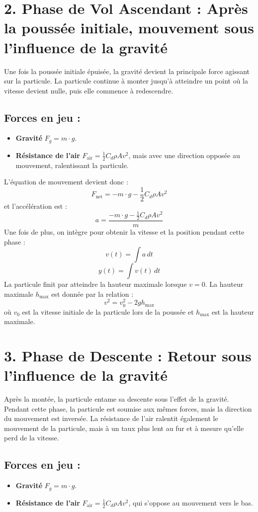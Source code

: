 \documentclass[12pt]{article}
\begin{document}
\section*{2. Phase de Vol Ascendant : Après la poussée initiale, mouvement sous l'influence de la gravité}

Une fois la poussée initiale épuisée, la gravité devient la principale force agissant sur la particule. La particule continue à monter jusqu'à atteindre un point où la vitesse devient nulle, puis elle commence à redescendre.

\subsection*{Forces en jeu :}
\begin{itemize}
  \item \textbf{Gravité} \( F_g = m \cdot g \).
  \item \textbf{Résistance de l'air} \( F_{\text{air}} = \frac{1}{2} C_d \rho A v^2 \), mais avec une direction opposée au mouvement, ralentissant la particule.
\end{itemize}

L’équation de mouvement devient donc :
\[
F_{\text{net}} = - m \cdot g - \frac{1}{2} C_d \rho A v^2
\]
et l'accélération est :
\[
a = \frac{- m \cdot g - \frac{1}{2} C_d \rho A v^2}{m}
\]
Une fois de plus, on intègre pour obtenir la vitesse et la position pendant cette phase :
\[
v(t) = \int a \, dt
\]
\[
y(t) = \int v(t) \, dt
\]
La particule finit par atteindre la hauteur maximale lorsque \( v = 0 \). La hauteur maximale \( h_{\text{max}} \) est donnée par la relation :
\[
v^2 = v_0^2 - 2 g h_{\text{max}}
\]
où \( v_0 \) est la vitesse initiale de la particule lors de la poussée et \( h_{\text{max}} \) est la hauteur maximale.

\section*{3. Phase de Descente : Retour sous l'influence de la gravité}

Après la montée, la particule entame sa descente sous l'effet de la gravité. Pendant cette phase, la particule est soumise aux mêmes forces, mais la direction du mouvement est inversée. La résistance de l'air ralentit également le mouvement de la particule, mais à un taux plus lent au fur et à mesure qu'elle perd de la vitesse.

\subsection*{Forces en jeu :}
\begin{itemize}
  \item \textbf{Gravité} \( F_g = m \cdot g \).
  \item \textbf{Résistance de l'air} \( F_{\text{air}} = \frac{1}{2} C_d \rho A v^2 \), qui s'oppose au mouvement vers le bas.
\end{itemize}
\end{document}
